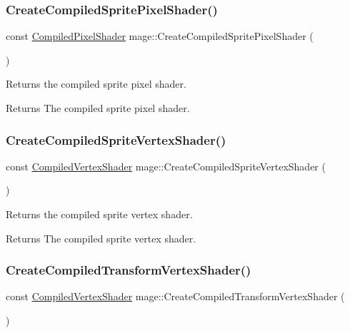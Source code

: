 \subsubsection{\texorpdfstring{Create\+Compiled\+Sprite\+Pixel\+Shader()}{CreateCompiledSpritePixelShader()}}
{\footnotesize\ttfamily const \hyperlink{structmage_1_1_compiled_pixel_shader}{Compiled\+Pixel\+Shader} mage\+::\+Create\+Compiled\+Sprite\+Pixel\+Shader (\begin{DoxyParamCaption}{ }\end{DoxyParamCaption})}

Returns the compiled sprite pixel shader.

\begin{DoxyReturn}{Returns}
The compiled sprite pixel shader. 
\end{DoxyReturn}
\hypertarget{namespacemage_a691c61df584113076792d13d0a612bb6}{}\label{namespacemage_a691c61df584113076792d13d0a612bb6} 
\subsubsection{\texorpdfstring{Create\+Compiled\+Sprite\+Vertex\+Shader()}{CreateCompiledSpriteVertexShader()}}
{\footnotesize\ttfamily const \hyperlink{structmage_1_1_compiled_vertex_shader}{Compiled\+Vertex\+Shader} mage\+::\+Create\+Compiled\+Sprite\+Vertex\+Shader (\begin{DoxyParamCaption}{ }\end{DoxyParamCaption})}

Returns the compiled sprite vertex shader.

\begin{DoxyReturn}{Returns}
The compiled sprite vertex shader. 
\end{DoxyReturn}
\hypertarget{namespacemage_a294f1637436bccffdf4d13aff8f104ac}{}\label{namespacemage_a294f1637436bccffdf4d13aff8f104ac} 
\subsubsection{\texorpdfstring{Create\+Compiled\+Transform\+Vertex\+Shader()}{CreateCompiledTransformVertexShader()}}
{\footnotesize\ttfamily const \hyperlink{structmage_1_1_compiled_vertex_shader}{Compiled\+Vertex\+Shader} mage\+::\+Create\+Compiled\+Transform\+Vertex\+Shader (\begin{DoxyParamCaption}{ }\end{DoxyParamCaption})}

